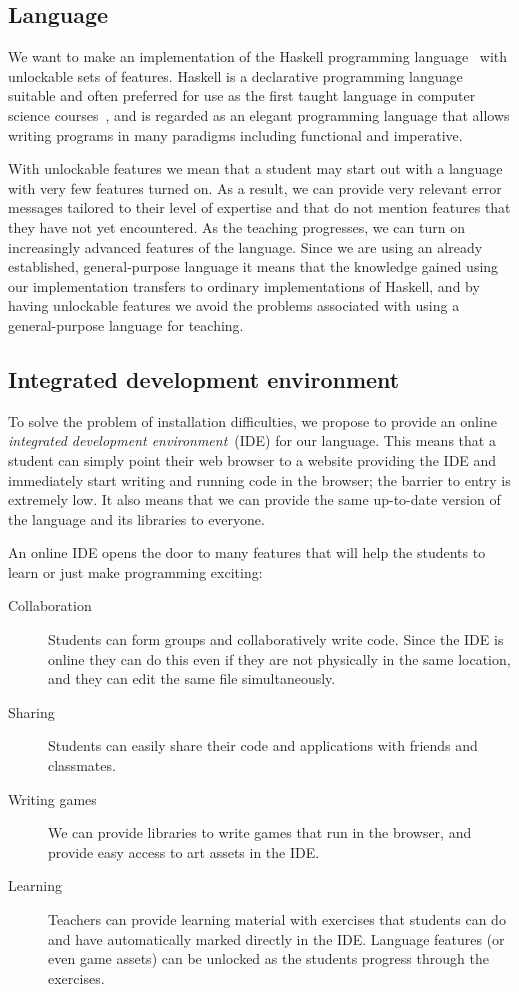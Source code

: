 \subsection{Language}

We want to make an implementation of the Haskell programming
language~\cite{marlow2010haskell} with unlockable sets of features.  Haskell is
a declarative programming language suitable and often preferred for use as the
first taught language in computer science courses~\cite{dijkstra2001members},
and is regarded as an elegant programming language that allows writing programs
in many paradigms including functional and imperative.

With unlockable features we mean that a student may start out with a language
with very few features turned on. As a result, we can provide very relevant
error messages tailored to their level of expertise and that do not mention
features that they have not yet encountered. As the teaching progresses, we can
turn on increasingly advanced features of the language.  Since we are using an
already established, general-purpose language it means that the knowledge
gained using our implementation transfers to ordinary implementations of
Haskell, and by having unlockable features we avoid the problems associated
with using a general-purpose language for teaching.

\subsection{Integrated development environment}

To solve the problem of installation difficulties, we propose to provide an
online \emph{integrated development environment}~(IDE) for our language.  This
means that a student can simply point their web browser to a website providing
the IDE and immediately start writing and running code in the browser; the
barrier to entry is extremely low. It also means that we can provide the same
up-to-date version of the language and its libraries to everyone.

An online IDE opens the door to many features that will help the students to
learn or just make programming exciting:
\begin{description}
  \item[Collaboration] Students can form groups and collaboratively write code. Since the IDE
    is online they can do this even if they are not physically in the same location,
    and they can edit the same file simultaneously.
  \item[Sharing] Students can easily share their code and applications with friends and
    classmates.
  \item[Writing games] We can provide libraries to write games that run in the
    browser, and provide easy access to art assets in the IDE.
  \item[Learning]
    Teachers can provide learning material with exercises that students can do
    and have automatically marked directly in the IDE. Language features (or even
    game assets) can be unlocked as the students progress through the
    exercises.
\end{description}

